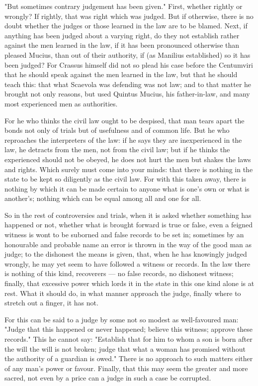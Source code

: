  "But sometimes contrary judgement has been given." First, whether rightly or wrongly? If rightly, that was right which was judged. But if otherwise, there is no doubt whether the judges or those learned in the law are to be blamed. Next, if anything has been judged about a varying right, do they not establish rather against the men learned in the law, if it has been pronounced otherwise than pleased Mucius, than out of their authority, if (as Manilius established) so it has been judged? For Crassus himself did not so plead his case before the Centumviri that he should speak against the men learned in the law, but that he should teach this: that what Scaevola was defending was not law; and to that matter he brought not only reasons, but used Quintus Mucius, his father-in-law, and many most experienced men as authorities.

 For he who thinks the civil law ought to be despised, that man tears apart the bonds not only of trials but of usefulness and of common life. But he who reproaches the interpreters of the law: if he says they are inexperienced in the law, he detracts from the men, not from the civil law; but if he thinks the experienced should not be obeyed, he does not hurt the men but shakes the laws and rights. Which surely must come into your minds: that there is nothing in the state to be kept so diligently as the civil law. For with this taken away, there is nothing by which it can be made certain to anyone what is one's own or what is another's; nothing which can be equal among all and one for all.

 So in the rest of controversies and trials, when it is asked whether something has happened or not, whether what is brought forward is true or false, even a feigned witness is wont to be suborned and false records to be set in; sometimes by an honourable and probable name an error is thrown in the way of the good man as judge; to the dishonest the means is given, that, when he has knowingly judged wrongly, he may yet seem to have followed a witness or records. In the law there is nothing of this kind, recoverers --- no false records, no dishonest witness; finally, that excessive power which lords it in the state in this one kind alone is at rest. What it should do, in what manner approach the judge, finally where to stretch out a finger, it has not.

 For this can be said to a judge by some not so modest as well-favoured man: "Judge that this happened or never happened; believe this witness; approve these records." This he cannot say: "Establish that for him to whom a son is born after the will the will is not broken; judge that what a woman has promised without the authority of a guardian is owed." There is no approach to such matters either of any man's power or favour. Finally, that this may seem the greater and more sacred, not even by a price can a judge in such a case be corrupted.

